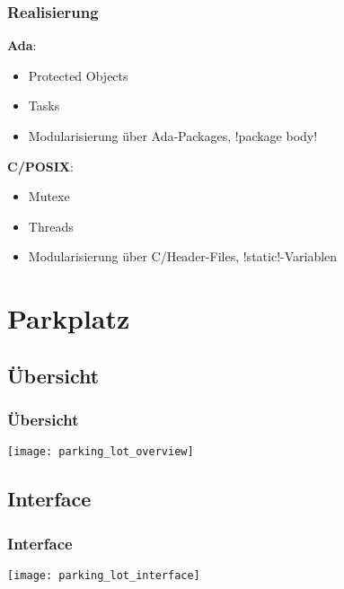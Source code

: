 \documentclass[ngerman]{presentation}
\begin{document}
\begin{frame}[c,label=realisierung]
    \frametitle{Realisierung}

    \textbf{Ada}:
    \begin{itemize}
        \item Protected Objects
        \item Tasks
        \item Modularisierung über Ada-Packages, \adainline!package body!
    \end{itemize}

    \pause

    \textbf{C/POSIX}:
    \begin{itemize}
        \item Mutexe
        \item Threads
        \item Modularisierung über C/Header-Files, \cinline!static!-Variablen
    \end{itemize}
\end{frame}

\section{Parkplatz}
\label{sec:parkplatz}

\subsection{Übersicht}
\label{sec:uebersicht}

\begin{frame}[c,label=uebersicht]
    \frametitle{Übersicht}

    \vspace{-0.6cm}\hspace*{-0.8cm}\texttt{[image: parking\_lot\_overview]}
\end{frame}

\subsection{Interface}
\label{sec:interface}

\begin{frame}[c,label=interface]
    \frametitle{Interface}

    \hspace*{-0.9cm}\texttt{[image: parking\_lot\_interface]}
\end{frame}
\end{document}
